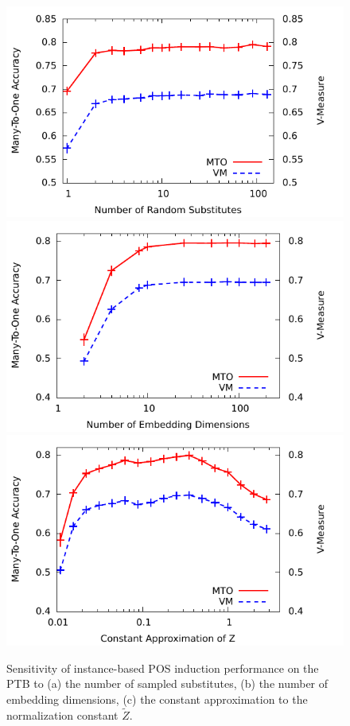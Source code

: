 \begin{figure}[ht!] \centering
\includegraphics[width=.90\columnwidth]{plot-s-ins.pdf}
\includegraphics[width=0.90\columnwidth]{plot-d-ins.pdf}
\includegraphics[width=0.90\columnwidth]{plot-z-ins.pdf}
\caption{Sensitivity of instance-based POS induction performance on
  the PTB to (a) the number of sampled substitutes, (b) the number of
  embedding dimensions, (c) the constant approximation to the
  normalization constant $\tilde{Z}$.
}
\label{plot-s}
\end{figure}


